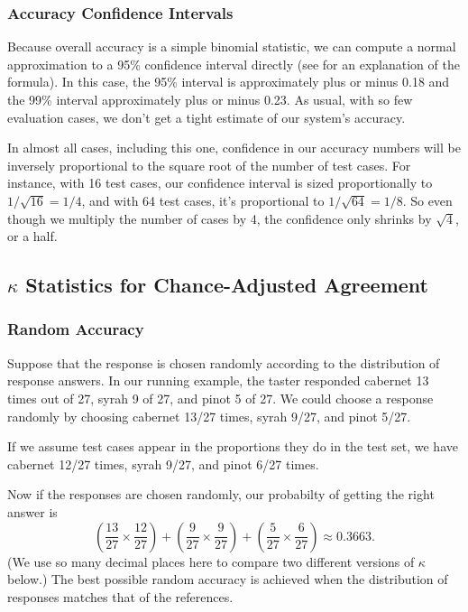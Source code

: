 \subsubsection{Accuracy Confidence Intervals} 

Because overall accuracy is a simple binomial statistic, we can
compute a normal approximation to a 95\% confidence interval directly
(see  for an explanation of the
formula).  In this case, the 95\% interval is approximately plus or
minus 0.18 and the 99\% interval approximately plus or minus 0.23.  As
usual, with so few evaluation cases, we don't get a tight estimate of
our system's accuracy.

In almost all cases, including this one, confidence in our accuracy
numbers will be inversely proportional to the square root of the
number of test cases.  For instance, with 16 test cases, our
confidence interval is sized proportionally to $1/\sqrt{16} = 1/4$,
and with 64 test cases, it's proportional to $1/\sqrt{64} = 1/8$.  So
even though we multiply the number of cases by 4, the confidence only
shrinks by $\sqrt{4}$, or a half.


\subsection{$\kappa$ Statistics for Chance-Adjusted Agreement}\label{section:classifier-eval-kappa}

\subsubsection{Random Accuracy}

Suppose that the response is chosen randomly according to the
distribution of response answers.  In our running example, the taster
responded cabernet 13 times out of 27, syrah 9 of 27, and pinot 5 of
27.  We could choose a response randomly by choosing cabernet 13/27
times, syrah 9/27, and pinot 5/27.  

If we assume test cases appear in the proportions they do in the test
set, we have cabernet 12/27 times, syrah 9/27, and pinot 6/27 times.

Now if the responses are chosen randomly, our probabilty of getting
the right answer is 
%
\begin{equation}
\left(\frac{13}{27} \times \frac{12}{27}\right)
+ \left(\frac{9}{27} \times \frac{9}{27}\right)
+ \left(\frac{5}{27} \times \frac{6}{27}\right)
\approx 0.3663.
\end{equation}
%
(We use so many decimal places here to compare two different versions
of $\kappa$ below.)  The best possible random accuracy is achieved
when the distribution of responses matches that of the references.

